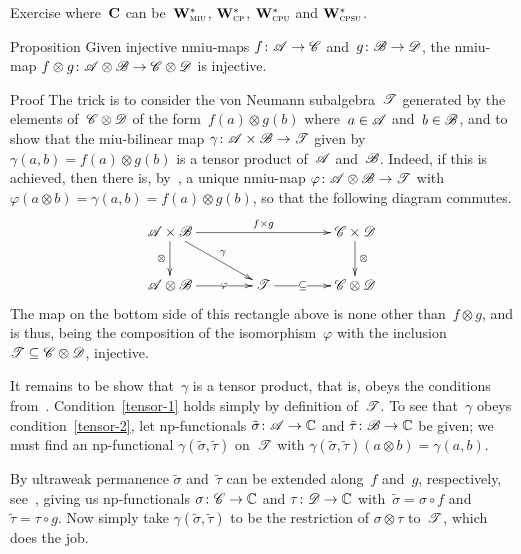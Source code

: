 \documentclass[a]{subfiles}
\begin{document}
\begin{parsec}
\begin{point}{Exercise}
where~$\mathbf{C}$
can be~$\mathbf{W}^*_{\text{\textsc{miu}}}$, $\mathbf{W}^*_{\text{\textsc{cp}}}$, $\mathbf{W}^*_{\text{\textsc{cpu}}}$
and $\mathbf{W}^*_{\text{\textsc{cpsu}}}$.
\end{point}
\begin{point}{Proposition}%
Given injective nmiu-maps
$f\colon \mathscr{A}\to\mathscr{C}$ and~$g\colon \mathscr{B}\to\mathscr{D}$,
the nmiu-map $f\otimes g\colon \mathscr{A}\otimes \mathscr{B}\to
\mathscr{C}\otimes\mathscr{D}$ is injective.
\begin{point}{Proof}%
The trick
is to consider the von Neumann subalgebra~$\mathscr{T}$
generated by
the elements of~$\mathscr{C}\otimes \mathscr{D}$
of the form~$f(a)\otimes g(b)$
where~$a\in\mathscr{A}$ and~$b\in\mathscr{B}$,
and to show that  the miu-bilinear map
$\gamma\colon \mathscr{A}\times\mathscr{B}\to\mathscr{T}$
given by~$\gamma(a,b)=f(a)\otimes g(b)$
is a tensor product of~$\mathscr{A}$ and~$\mathscr{B}$.
Indeed,
if this is achieved,
then
there is, by~,
a unique nmiu-map $\varphi\colon \mathscr{A}\otimes\mathscr{B}\to\mathscr{T}$
with $\varphi(a\otimes b)=\gamma(a,b)
=f(a)\otimes g(b)$,
so that the following diagram commutes.
\begin{equation*}
\xymatrix@C=4em{
\scrA\times \scrB
\ar[rr]^-{f\times g}
\ar[rd]^-\gamma
\ar[d]_-\otimes
&
&
\scrC\times\scrD 
\ar[d]^-\otimes
\\
\scrA\otimes\scrB
\ar[r]|-\varphi
&
\scrT
\ar[r]|-\subseteq
&
\scrC\otimes\scrD
}
\end{equation*}
The map on the bottom side of this rectangle above is
none other than~$f\otimes g$,
and is thus,
being
the composition of the isomorphism~$\varphi$
with the inclusion $\mathscr{T}\subseteq \mathscr{C}\otimes\mathscr{D}$,
injective.

It remains to be show that~$\gamma$
is a tensor product,
that is, obeys the conditions from~.
Condition~\ref{tensor-1}
holds simply by definition of~$\mathscr{T}$.
To see that~$\gamma$
obeys condition~\ref{tensor-2},
let np-functionals
$\tilde\sigma\colon \mathscr{A}\to\mathbb{C}$
and $\tilde\tau\colon \mathscr{B}\to\mathbb{C}$ be given;
we must find an np-functional $\gamma(\tilde\sigma,
\tilde\tau)$ on~$\mathscr{T}$
with $\gamma(\tilde\sigma,\tilde\tau)(a\otimes b)
= \gamma(a,b)$.

By ultraweak permanence
$\tilde\sigma$ and~$\tilde\tau$
can be extended along~$f$ and~$g$, respectively,
see~,
giving us np-functionals $\sigma\colon \mathscr{C}\to\mathbb{C}$
and $\tau\colon\mathscr{D}\to\mathbb{C}$
with~$\tilde\sigma = \sigma\circ f$
and $\tilde\tau = \tau\circ g$.
Now simply take $\gamma(\tilde\sigma,\tilde\tau)$
to be the restriction
of $\sigma\otimes \tau$
to~$\mathscr{T}$,
which does the job.


\end{point}
\end{point}
\end{parsec}
\end{document}

